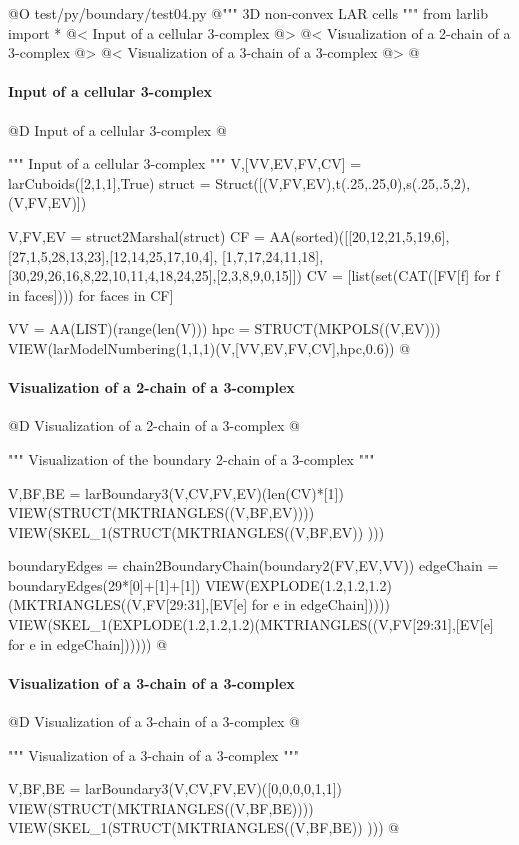 \documentclass[11pt,oneside]{article}	%
\begin{document}
@O test/py/boundary/test04.py
@{""" 3D non-convex LAR cells """
from larlib import *
@< Input of a cellular 3-complex @>
@< Visualization of a 2-chain of a 3-complex @>
@< Visualization of a 3-chain of a 3-complex @>
@}

\paragraph{Input of a cellular 3-complex}
@D Input of a cellular 3-complex
@{""" Input of a cellular 3-complex """
V,[VV,EV,FV,CV] = larCuboids([2,1,1],True)
struct = Struct([(V,FV,EV),t(.25,.25,0),s(.25,.5,2),(V,FV,EV)])

V,FV,EV = struct2Marshal(struct)
CF = AA(sorted)([[20,12,21,5,19,6],[27,1,5,28,13,23],[12,14,25,17,10,4],
[1,7,17,24,11,18],[30,29,26,16,8,22,10,11,4,18,24,25],[2,3,8,9,0,15]])
CV = [list(set(CAT([FV[f]  for f in faces]))) for faces in CF]

VV = AA(LIST)(range(len(V)))
hpc = STRUCT(MKPOLS((V,EV)))
VIEW(larModelNumbering(1,1,1)(V,[VV,EV,FV,CV],hpc,0.6))
@}


\paragraph{Visualization of a 2-chain of a 3-complex}
@D Visualization of a 2-chain of a 3-complex
@{""" Visualization of the boundary 2-chain of a 3-complex """

V,BF,BE = larBoundary3(V,CV,FV,EV)(len(CV)*[1])
VIEW(STRUCT(MKTRIANGLES((V,BF,EV))))
VIEW(SKEL_1(STRUCT(MKTRIANGLES((V,BF,EV)) )))

boundaryEdges = chain2BoundaryChain(boundary2(FV,EV,VV))
edgeChain = boundaryEdges(29*[0]+[1]+[1]) 
VIEW(EXPLODE(1.2,1.2,1.2)(MKTRIANGLES((V,FV[29:31],[EV[e] for e in edgeChain]))))
VIEW(SKEL_1(EXPLODE(1.2,1.2,1.2)(MKTRIANGLES((V,FV[29:31],[EV[e] for e in edgeChain])))))
@}

\paragraph{Visualization of a 3-chain of a 3-complex}
@D Visualization of a 3-chain of a 3-complex
@{""" Visualization of a 3-chain of a 3-complex """

V,BF,BE = larBoundary3(V,CV,FV,EV)([0,0,0,0,1,1])
VIEW(STRUCT(MKTRIANGLES((V,BF,BE))))
VIEW(SKEL_1(STRUCT(MKTRIANGLES((V,BF,BE)) )))
@}
\end{document}
